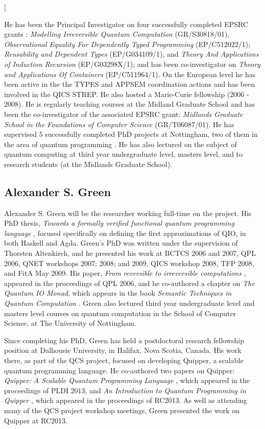 \documentclass[a4paper]{article}
\begin{document}
\twocolumn[

He has been the Principal Investigator on four successfully completed
EPSRC grants : \emph{Modelling Irreversible Quantum Computation}
(GR/S30818/01), \emph{Observational Equality For Dependently Typed
  Programming} (EP/C512022/1); \emph{Reusability and Dependent Types} (EP/G034109/1), 
and 
\emph{Theory And Applications of Induction
  Recursion} (EP/G03298X/1); and has been co-investigator on
\emph{Theory and Applications Of Containers} (EP/C511964/1). 
On the European level he has been active in the the
TYPES and APPSEM coordination actions and has been involved in the
QICS STREP. He also hosted a Marie-Curie fellowship (2006 - 2008). He
is regularly teaching courses at the Midland Graduate School and has
been the co-investigator of the associated EPSRC grant: \emph{Midlands
  Graduate School in the Foundations of Computer Science}
(GR/T06087/01). He has supervised 5 successfully completed PhD
projects at Nottingham, two of them in the area of quantum
programming . He has also lectured 
on the subject of quantum computing at third year
undergraduate level, masters level, and to research students 
(at the Midlands Graduate School).

\subsection*{Alexander S. Green}
Alexander S. Green will be the researcher working full-time on the
project. His PhD thesis, \emph{Towards a formally verified functional
  quantum programming language} , focused
specifically on defining the first approximations of QIO, in both
Haskell and Agda. Green's PhD was written under the supervision of
Thorsten Altenkirch, and he presented his work at BCTCS 2006
and 2007, QPL 2006, QNET workshops 2007; 2008; and 2009, QICS workshop
2008, TFP 2008, and FitA May 2009. His paper, \emph{From reversible to
irreversible computations} , appeared in the
proceedings of QPL 2006, and he co-authored a chapter on \emph{The
Quantum IO Monad}, which appears in the book \emph{Semantic Techniques
in Quantum Computation} . Green also lectured third
year undergraduate level and masters level courses on quantum
computation in the School of Computer Science, at The University of
Nottingham. 

Since completing his PhD, Green has held a postdoctoral research
fellowship position at Dalhousie University, in Halifax, Nova Scotia,
Canada. His work there, as part of the QCS project, focused on
developing Quipper, a scalable quantum programming language. He
co-authored two papers on Quipper: \emph{Quipper: A Scalable Quantum
  Programming Language} , which appeared
in the proceedings of PLDI 2013, and \emph{An Introduction to Quantum
  Programming in Quipper} , which appeared in
the proceedings of RC2013. As well as attending many of the QCS
project workshop meetings, Green presented the work on Quipper at
RC2013.
\end{document}
